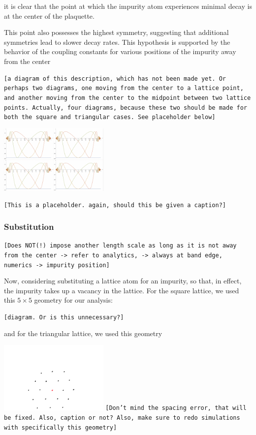 \documentclass[aps,pra,superscriptaddress,twocolumn]{revtex4-1}
\newcommand{\commentSB}[1]{\texttt{\color{blue}[#1]}}
\newcommand{\commentSO}[1]{\texttt{\color{orange}[#1]}}
\begin{document}
it is clear that the point at which the impurity atom experiences minimal decay is at the center of the plaquette. 


This point also possesses the highest symmetry, suggesting that additional symmetries lead to slower decay rates. This hypothesis is supported by the behavior of the coupling constants for various positions of the impurity away from the center 

\commentSB{a diagram of this description, which has not been made yet. Or perhaps two diagrams, one moving from the center to a lattice point, and another moving from the center to the midpoint between two lattice points. Actually, four diagrams, because these two should be made for both the square and triangular cases. See placeholder below}

    \includegraphics[width=0.4\textwidth]{figures/triangle_and_square_interstitial_coupling.png}


\commentSB{This is a placeholder. again, should this be given a caption?}


\subsubsection{Substitution}
\commentSO{Does NOT(!) impose another length scale as long as it is not away from the center -> refer to analytics, -> always at band edge, numerics -> impurity position}

Now, considering substituting a lattice atom for an impurity, so that, in effect, the impurity takes up a vacancy in the lattice. For the square lattice, we used this $5 \times 5$ geometry for our analysis:

\commentSB{diagram. Or is this unnecessary?}

and for the triangular lattice, we used this geometry

\includegraphics[width=0.4\textwidth]{figures/triangle_substitution_geometry.png}
\commentSB{Don't mind the spacing error, that will be fixed. Also, caption or not? Also, make sure to redo simulations with specifically this geometry}
\end{document}
